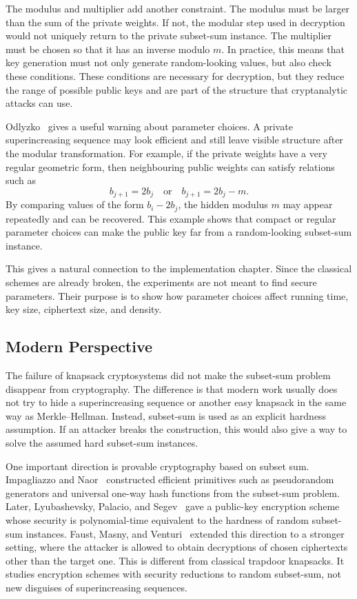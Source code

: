 The modulus and multiplier add another constraint. The modulus must be larger
than the sum of the private weights. If not, the modular step used in
decryption would not uniquely return to the private subset-sum instance. The
multiplier must be chosen so that it has an inverse modulo $m$. In practice,
this means that key generation must not only generate random-looking values,
but also check these conditions. These conditions are necessary for decryption,
but they reduce the range of possible public keys and are part of the structure
that cryptanalytic attacks can use.

Odlyzko~\cite{OdlyzkoRiseFall} gives a useful warning about parameter choices. A private
superincreasing sequence may look efficient and still leave visible structure
after the modular transformation. For example, if the private weights have a
very regular geometric form, then neighbouring public weights can satisfy
relations such as
\[
    b_{j+1}=2b_j
    \quad\text{or}\quad
    b_{j+1}=2b_j-m.
\]
By comparing values of the form \(b_i-2b_j\), the hidden modulus \(m\) may
appear repeatedly and can be recovered. This example shows that compact or
regular parameter choices can make the public key far from a random-looking
subset-sum instance.


This gives a natural connection to the implementation chapter. Since the
classical schemes are already broken, the experiments are not meant to find
secure parameters. Their purpose is to show how parameter choices affect
running time, key size, ciphertext size, and density.

\subsection{Modern Perspective}

The failure of knapsack cryptosystems did not make the subset-sum problem
disappear from cryptography. The difference is that modern work usually
does not try to hide a superincreasing sequence or another easy knapsack in the
same way as Merkle--Hellman. Instead, subset-sum is used as an explicit
hardness assumption. If an attacker breaks the construction, this would also
give a way to solve the assumed hard subset-sum instances.

One important direction is provable cryptography based on subset sum.
Impagliazzo and Naor~\cite{ImpagliazzoNaor1996} constructed efficient primitives such as pseudorandom
generators and universal one-way hash functions from the subset-sum
problem. Later, Lyubashevsky, Palacio, and Segev~\cite{LyubashevskyPalacioSegev2010}
gave a public-key encryption scheme whose security is polynomial-time
equivalent to the hardness of random subset-sum
instances. Faust, Masny, and Venturi~\cite{FaustMasnyVenturi2015}
extended this direction to a stronger setting, where the attacker is allowed to
obtain decryptions of chosen ciphertexts other than the target one. This is
different from classical trapdoor knapsacks. It studies encryption schemes with
security reductions to random subset-sum, not new disguises of superincreasing
sequences.

